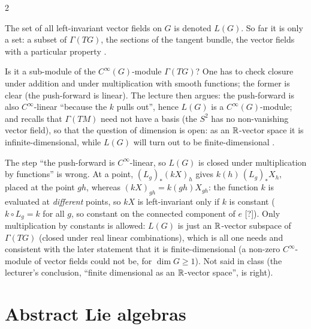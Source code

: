 \begin{paracol}{2}
\begin{definition}\label{def:ll-LG}
The set of all left-invariant vector fields on $G$ is denoted $L(G)$. So far it is only a set: a subset of $\Gamma(TG)$, the sections of the tangent bundle, the vector fields with a particular property   .
\end{definition}
Is it a sub-module of the $C^\infty(G)$-module $\Gamma(TG)$? One has to check closure under addition and under multiplication with smooth functions; the former is clear (the push-forward is linear). The lecture then argues: the push-forward is also $C^\infty$-linear ``because the $k$ pulls out'', hence $L(G)$ is a $C^\infty(G)$-module; and recalls that $\Gamma(TM)$ need not have a basis (the $S^2$ has no non-vanishing vector field), so that the question of dimension is open: as an $\mathbb{R}$-vector space it is infinite-dimensional, while $L(G)$ will turn out to be finite-dimensional       .
\begin{coursenote}
The step ``the push-forward is $C^\infty$-linear, so $L(G)$ is closed under multiplication by functions'' is wrong. At a point, $(L_g)_*(kX)_{h}$ gives $k(h)\,(L_g)_*X_h$, placed at the point $gh$, whereas $(kX)_{gh}=k(gh)X_{gh}$: the function $k$ is evaluated at \emph{different} points, so $kX$ is left-invariant only if $k$ is constant ($k\circ L_g=k$ for all $g$, so constant on the connected component of $e$ [?]). Only multiplication by constants is allowed: $L(G)$ is just an $\mathbb{R}$-vector subspace of $\Gamma(TG)$ (closed under real linear combinations), which is all one needs and consistent with the later statement that it is finite-dimensional (a non-zero $C^\infty$-module of vector fields could not be, for $\dim G\ge1$). Not said in class (the lecturer's conclusion, ``finite dimensional as an $\mathbb{R}$-vector space'', is right).  
\end{coursenote}

\section{Abstract Lie algebras}\label{sec:ll-algebra}


\end{paracol}
